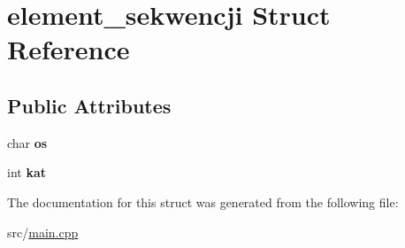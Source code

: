 \hypertarget{structelement__sekwencji}{}\section{element\+\_\+sekwencji Struct Reference}
\label{structelement__sekwencji}
\subsection*{Public Attributes}
\begin{DoxyCompactItemize}
\item 
\mbox{\label{structelement__sekwencji_a3e4e0297377fc8fc44142ba73a8a0165}} 
char {\bfseries os}
\item 
\mbox{\label{structelement__sekwencji_a22bf3d71d66f3a92bfab955d453cbe7c}} 
int {\bfseries kat}
\end{DoxyCompactItemize}


The documentation for this struct was generated from the following file\+:\begin{DoxyCompactItemize}
\item 
src/\hyperlink{main_8cpp}{main.\+cpp}\end{DoxyCompactItemize}
